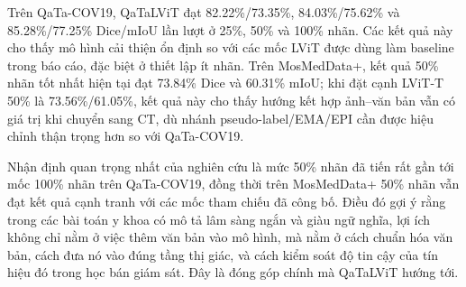 Trên QaTa-COV19, QaTaLViT đạt 82.22\%/73.35\%, 84.03\%/75.62\% và 85.28\%/77.25\% Dice/mIoU lần lượt ở 25\%, 50\% và 100\% nhãn. Các kết quả này cho thấy mô hình cải thiện ổn định so với các mốc LViT được dùng làm baseline trong báo cáo, đặc biệt ở thiết lập ít nhãn. Trên MosMedData+, kết quả 50\% nhãn tốt nhất hiện tại đạt 73.84\% Dice và 60.31\% mIoU; khi đặt cạnh LViT-T 50\% là 73.56\%/61.05\%, kết quả này cho thấy hướng kết hợp ảnh--văn bản vẫn có giá trị khi chuyển sang CT, dù nhánh pseudo-label/EMA/EPI cần được hiệu chỉnh thận trọng hơn so với QaTa-COV19.

Nhận định quan trọng nhất của nghiên cứu là mức 50\% nhãn đã tiến rất gần tới mốc 100\% nhãn trên QaTa-COV19, đồng thời trên MosMedData+ 50\% nhãn vẫn đạt kết quả cạnh tranh với các mốc tham chiếu đã công bố. Điều đó gợi ý rằng trong các bài toán y khoa có mô tả lâm sàng ngắn và giàu ngữ nghĩa, lợi ích không chỉ nằm ở việc thêm văn bản vào mô hình, mà nằm ở cách chuẩn hóa văn bản, cách đưa nó vào đúng tầng thị giác, và cách kiểm soát độ tin cậy của tín hiệu đó trong học bán giám sát. Đây là đóng góp chính mà QaTaLViT hướng tới.

